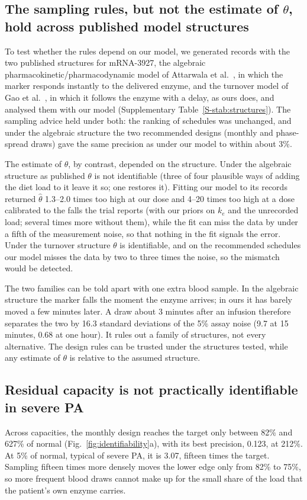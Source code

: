 \documentclass[11pt]{article}
\begin{document}
\subsection*{The sampling rules, but not the estimate of \texorpdfstring{$\theta$}{theta}, hold across published model structures}
To test whether the rules depend on our model, we generated records with the two published structures for mRNA-3927, the algebraic
pharmacokinetic/pharmacodynamic model of Attarwala et al.~\cite{pkpd_translational}, in which the
marker responds instantly to the delivered enzyme, and the turnover model of Gao et
al.~\cite{gao2025acop}, in which it follows the enzyme with a delay, as ours does, and analysed them
with our model (Supplementary Table~\ref{S-stab:structures}). The sampling advice held under both: the ranking of schedules was unchanged, and under the algebraic structure the two recommended designs (monthly and phase-spread draws) gave the same precision as under our model to within about 3\%.

The estimate of $\theta$, by contrast, depended on the structure. Under the algebraic structure as published $\theta$ is not
identifiable (three of four plausible ways of adding the diet load to it leave it so; one restores
it). Fitting our model to its records returned $\hat\theta$ 1.3--2.0 times too high at our dose and
4--20 times too high at a dose calibrated to the falls the trial reports (with our priors on $k_e$
and the unrecorded load; several times more without them), while the fit can miss the data by under
a fifth of the measurement noise, so that nothing in the fit signals the error. Under the turnover structure $\theta$
is identifiable, and on the recommended schedules our model misses the data by two to three times the noise, so the mismatch would be detected.

The two families can be told apart with one extra blood sample. In the algebraic structure the marker falls the moment
the enzyme arrives; in ours it has barely moved a few minutes later. A draw about 3 minutes
after an infusion therefore separates the two by 16.3 standard deviations of the 5\% assay noise
(9.7 at 15 minutes, 0.68 at one hour). It rules out a family of structures, not every
alternative. The design rules can be trusted under the structures tested, while any estimate of
$\theta$ is relative to the assumed structure.

\subsection*{Residual capacity is not practically identifiable in severe PA}
Across capacities, the monthly design reaches the target only between 82\% and 627\% of normal
(Fig.~\ref{fig:identifiability}a), with its best precision, 0.123, at 212\%. At 5\% of normal,
typical of severe PA, it is 3.07, fifteen times the target. Sampling fifteen times
more densely moves the lower edge only from 82\% to 75\%, so more frequent blood draws cannot make
up for the small share of the load that the patient's own enzyme carries.
\end{document}
